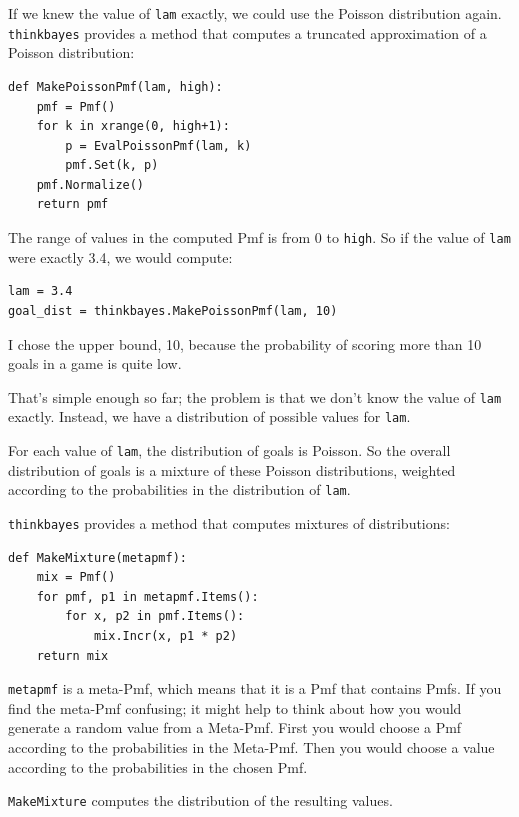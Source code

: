 \documentclass[12pt]{book}
\begin{document}
If we knew the value of {\tt lam} exactly, we could use the
Poisson distribution again.  \verb"thinkbayes" provides a
method that computes a truncated approximation of a Poisson
distribution:

\begin{verbatim}
def MakePoissonPmf(lam, high):
    pmf = Pmf()
    for k in xrange(0, high+1):
        p = EvalPoissonPmf(lam, k)
        pmf.Set(k, p)
    pmf.Normalize()
    return pmf
\end{verbatim}  

The range of values in the computed Pmf is from 0 to {\tt high}.
So if the value of {\tt lam} were exactly 3.4, we would compute:

\begin{verbatim}
lam = 3.4
goal_dist = thinkbayes.MakePoissonPmf(lam, 10)
\end{verbatim}

I chose the upper bound, 10, because the probability of scoring
more than 10 goals in a game is quite low.

That's simple enough so far; the problem is that we don't know
the value of {\tt lam} exactly.  Instead, we have a distribution
of possible values for {\tt lam}.

For each value of {\tt lam}, the distribution of goals is Poisson.
So the overall distribution of goals is a mixture of these
Poisson distributions, weighted according to the probabilities
in the distribution of {\tt lam}.

\verb"thinkbayes" provides a method that computes mixtures
of distributions:

\begin{verbatim}
def MakeMixture(metapmf):
    mix = Pmf()
    for pmf, p1 in metapmf.Items():
        for x, p2 in pmf.Items():
            mix.Incr(x, p1 * p2)
    return mix
\end{verbatim}  

{\tt metapmf} is a meta-Pmf, which means that it is a Pmf that
contains Pmfs.  If you find the meta-Pmf confusing; it might
help to think about how you would generate a random value from
a Meta-Pmf.  First you would choose a Pmf according to the
probabilities in the Meta-Pmf.  Then you would choose a value
according to the probabilities in the chosen Pmf.

\verb"MakeMixture" computes the distribution of the resulting
values.
\end{document}
